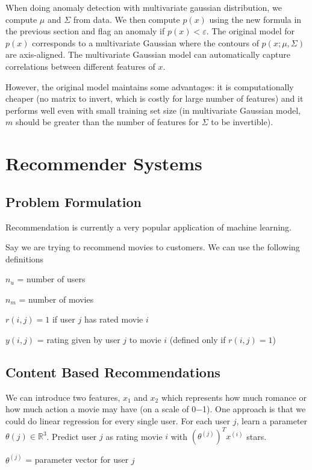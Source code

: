 \documentclass[a4paper,11pt]{report}
\begin{document}
When doing anomaly detection with multivariate gaussian distribution, we compute $\mu$ and $\Sigma$ from data. We then compute $p(x)$ using the new formula in the previous section and flag an anomaly if $p(x) < \varepsilon$.
The original model for $p(x)$ corresponds to a multivariate Gaussian where the contours of $p(x;\mu,\Sigma)$ are axis-aligned.
The multivariate Gaussian model can automatically capture correlations between different features of $x$.

However, the original model maintains some advantages: it is computationally cheaper (no matrix to invert, which is costly for large number of features) and it performs well even with small training set size (in multivariate Gaussian model, $m$ should be greater than the number of features for $\Sigma$ to be invertible).


\section{Recommender Systems}

\subsection*{Problem Formulation}

Recommendation is currently a very popular application of machine learning.

Say we are trying to recommend movies to customers. We can use the following definitions

$n_u$ = number of users

$n_m$ = number of movies

$r(i,j) = 1$ if user $j$ has rated movie $i$

$y(i,j)$ = rating given by user $j$ to movie $i$ (defined only if $r(i,j)=1$)

\subsection*{Content Based Recommendations}

We can introduce two features, $x_1$ and $x_2$ which represents how much romance or how much action a movie may have (on a scale of 0−1). One approach is that we could do linear regression for every single user. For each user $j$, learn a parameter $\theta(j)\in \mathbb{R}^3$. Predict user $j$ as rating movie $i$ with $(\theta^{(j)})^Tx^{(i)}$ stars.

$\theta^{(j)}$ = parameter vector for user $j$
\end{document}
